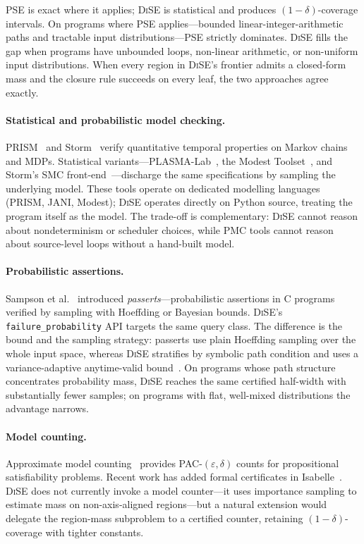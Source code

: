\documentclass[runningheads]{llncs}
\newcommand{\toolname}{\textsc{DiSE}}
\newcommand{\code}[1]{\texttt{#1}}
\begin{document}
PSE is exact where it applies; \toolname{} is statistical and
produces $(1-\delta)$-coverage intervals.  On programs where PSE
applies---bounded linear-integer-arithmetic paths and tractable input
distributions---PSE strictly dominates.  \toolname{} fills the gap
when programs have unbounded loops, non-linear arithmetic, or
non-uniform input distributions.  When every region in \toolname{}'s
frontier admits a closed-form mass and the closure rule succeeds on
every leaf, the two approaches agree exactly.

\paragraph{Statistical and probabilistic model checking.}
PRISM~\cite{kwiatkowska2011prism} and Storm~\cite{hensel2022storm}
verify quantitative temporal properties on Markov chains and MDPs.
Statistical variants---PLASMA-Lab~\cite{boyer2013plasma}, the Modest
Toolset~\cite{hartmanns2014modest}, and Storm's SMC
front-end~\cite{schoolderman2024storm}---discharge the same
specifications by sampling the underlying model.  These tools operate
on dedicated modelling languages (PRISM, JANI, Modest); \toolname{}
operates directly on Python source, treating the program itself as the
model.  The trade-off is complementary: \toolname{} cannot reason about
nondeterminism or scheduler choices, while PMC tools cannot reason
about source-level loops without a hand-built model.

\paragraph{Probabilistic assertions.}
Sampson et al.~\cite{sampson2014passert} introduced
\emph{passerts}---probabilistic assertions in C programs verified by
sampling with Hoeffding or Bayesian bounds.  \toolname{}'s
\code{failure\_probability} API targets the same query class.  The
difference is the bound and the sampling strategy: passerts use plain
Hoeffding sampling over the whole input space, whereas \toolname{}
stratifies by symbolic path condition and uses a variance-adaptive
anytime-valid bound~\cite{waudbysmith2024betting}.  On programs whose
path structure concentrates probability mass, \toolname{} reaches the
same certified half-width with substantially fewer samples; on
programs with flat, well-mixed distributions the advantage narrows.

\paragraph{Model counting.}
Approximate model counting~\cite{chakraborty2013approxmc,yang2023approxmc6}
provides PAC-$(\varepsilon,\delta)$ counts for propositional
satisfiability problems.  Recent work has added formal certificates
in Isabelle~\cite{kiesl2024certified}.  \toolname{} does not currently
invoke a model counter---it uses importance sampling to estimate mass
on non-axis-aligned regions---but a natural extension would delegate
the region-mass subproblem to a certified counter, retaining
$(1-\delta)$-coverage with tighter constants.
\end{document}
